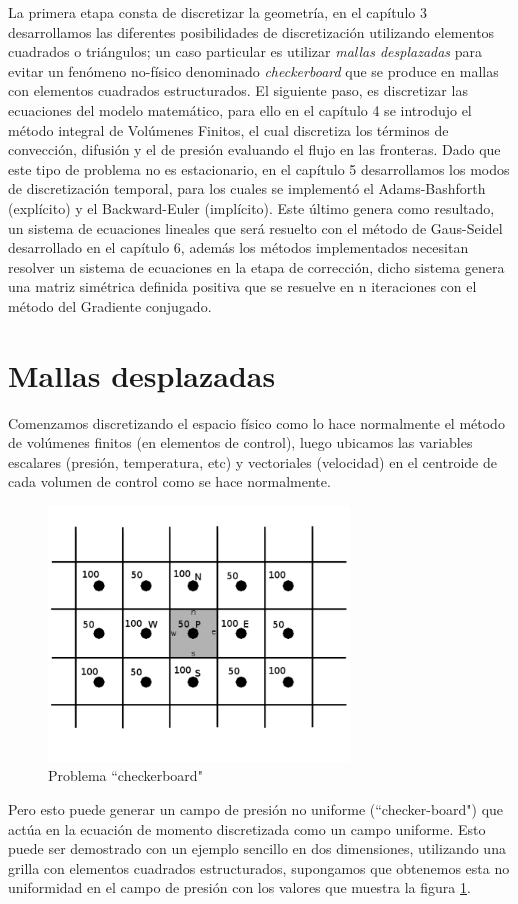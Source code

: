 \documentclass[a4paper,10pt, oneside]{book}
\begin{document}
La primera etapa consta de discretizar la geometría, en el capítulo 3 desarrollamos las diferentes posibilidades de discretización utilizando elementos cuadrados o triángulos; un caso particular es utilizar \textit{mallas desplazadas} para evitar un fenómeno no-físico denominado \textit{checkerboard} que se produce en mallas con elementos cuadrados estructurados. El siguiente paso, es discretizar las ecuaciones del modelo matemático, para ello en el capítulo 4 se introdujo el método integral de Volúmenes Finitos, el cual discretiza los términos de convección, difusión y el de presión evaluando el flujo en las fronteras. Dado que este tipo de problema no es estacionario, en el capítulo 5 desarrollamos los modos de discretización temporal, para los cuales se implementó el Adams-Bashforth (explícito) y el Backward-Euler (implícito). Este último genera como resultado, un sistema de ecuaciones lineales que será resuelto con el método de Gaus-Seidel desarrollado en el capítulo 6, además los métodos implementados necesitan resolver un sistema de ecuaciones en la etapa de corrección, dicho sistema genera una matriz simétrica definida positiva que se resuelve en n iteraciones con el método del Gradiente conjugado.

\section{Mallas desplazadas}

Comenzamos discretizando el espacio físico como lo hace normalmente el método de volúmenes finitos (en elementos de control), luego ubicamos las variables escalares (presión, temperatura, etc) y vectoriales (velocidad) en el centroide de cada volumen de control como se hace normalmente. 
\begin{figure}[h!]
  \centering
  \includegraphics[width=8cm]{Img/7-1}
  \caption{Problema ``checkerboard"}
  \label{fig:7-1}
\end{figure}
Pero esto puede generar un campo de presión no uniforme (``checker-board") que actúa en la ecuación de momento discretizada como un campo uniforme. Esto puede ser demostrado con un ejemplo sencillo en dos dimensiones, utilizando una grilla con elementos cuadrados estructurados, supongamos que obtenemos esta no uniformidad en el campo de presión con los valores que muestra la figura \ref{fig:7-1}. 
\end{document}
